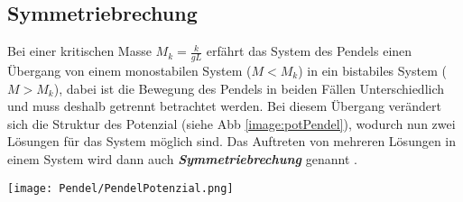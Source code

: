 \subsection{Symmetriebrechung}
\label{sub:symbrechung}
Bei einer {kritischen Masse} $M_k=\frac{k}{gL}$ erfährt das System des Pendels einen Übergang von einem monostabilen System ($M<M_k$) in ein bistabiles System ($M>M_k$), dabei ist die Bewegung des Pendels in beiden Fällen Unterschiedlich und muss deshalb getrennt betrachtet werden. Bei diesem Übergang verändert sich die Struktur des Potenzial (siehe Abb \ref{image:potPendel}), wodurch nun zwei Lösungen für das System möglich sind. Das Auftreten von mehreren Lösungen in einem System wird dann auch \textit{\textbf{Symmetriebrechung}} genannt \citep{Lueck}.
\begin{center}
    \texttt{[image: Pendel/PendelPotenzial.png]}
    \label{image:potPendel}
\end{center}

